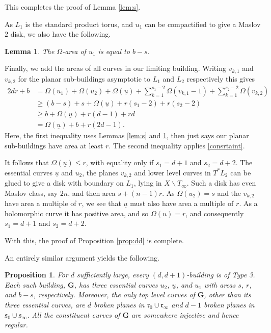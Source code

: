 \documentclass[12pt]{amsart}
\newtheorem{proposition}[theorem]{Proposition}
\newtheorem{lemma}[theorem]{Lemma}
\theoremstyle{definition}
\begin{document}
\medskip

\noindent This completes the proof of Lemma \ref{lem:s}. 

\medskip

As $L_1$ is the standard product torus, and $u_1$ can be compactified to give a Maslov $2$ disk, we also have the following.
\begin{lemma}\label{lem:b-s}
The $\Omega$-area of $u_1$ is equal to $b-s$.
\end{lemma}

Finally, we add the areas of all curves in our limiting building. Writing $v_{k,1}$ and $v_{k,2}$ for the planar sub-buildings asymptotic to $L_1$ and $L_2$ respectively this gives
\begin{align*}
2dr + b &= \Omega(u_1) + \Omega(u_2) + \Omega(\underline{u}) + \sum_{k=1}^{s_1-2} \Omega(v_{k,1}-1) + \sum_{k=1}^{s_2-2} \Omega(v_{k,2}) \\
{}&\geq (b-s) + s + \Omega(\underline{u}) + r(s_1 -2) + r(s_2-2) \\
{}&\geq b + \Omega(\underline{u}) + r(d-1) + rd\\
{}&= \Omega(\underline{u}) + b + r(2d-1).
\end{align*}
Here, the first inequality uses Lemmas \ref{lem:s} and \ref{lem:b-s}, then just says our planar sub-buildings have area at least $r$. The second inequality applies \eqref{consrtaint}.

It follows that $\Omega(\underline{u}) \le r$, with equality only if $s_1 = d+1$ and $s_2 = d+2$. The essential curves $\underline{u}$ and $u_2$, the planes $v_{k,2}$ and lower level curves in $T^* L_2$ can be glued to give a disk with boundary on $L_1$, lying in $X \smallsetminus T_\infty$. Such a disk has even Maslov class, say $2n$, and then area $s + (n-1)r$. As $\Omega(u_2)=s$ and the $v_{k,2}$ have area a multiple of $r$, we see that $\underline{u}$ must also have area a multiple of $r$. As a holomorphic curve it has positive area, and so $\Omega(\underline{u}) = r$, and consequently $s_1 = d+1$ and $s_2 = d+2$.

With this, the proof of Proposition \ref{prop:dd} is complete. 

\bigskip

An entirely similar argument yields the following.

\begin{proposition}\label{prop:dd+1} For $d$ sufficiently large, every $(d,d+1)$-building is of Type 3. Each such building, $\mathbf{G}$, has three essential curves $u_2$, $\underline{u}$, and $u_1$ with areas $s$, $r$, and $b-s$, respectively. Moreover, the only top level curves of $\mathbf{G}$, other than its three essential curves, are $d$ broken planes in $\mathfrak{r}_0 \cup \mathfrak{r}_{\infty}$ and $d-1$ broken planes in $\mathfrak{s}_0 \cup \mathfrak{s}_{\infty}$. 
All the constituent curves of $\mathbf{G}$ are somewhere injective and hence regular. 
\end{proposition}
\end{document}
